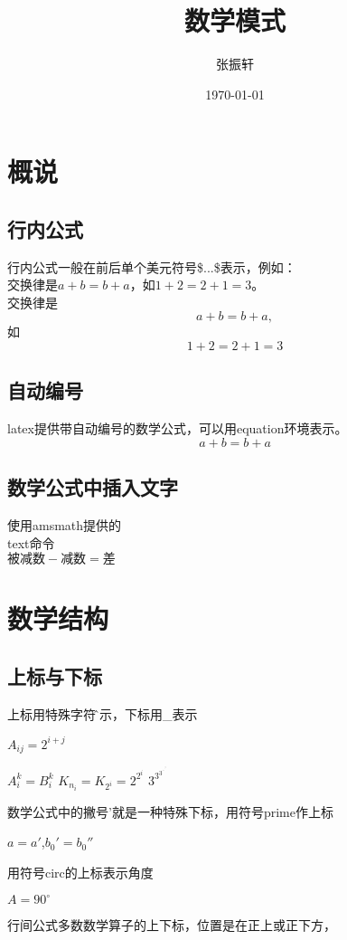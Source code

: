 \documentclass[12pt]{article}
\title{数学模式}
\author{张振轩}
\date{\today}
\begin{document}
	
\maketitle
\section{概说}
\subsection{行内公式}
行内公式一般在前后单个美元符号\$...\$表示，例如：\\
交换律是$a+b=b+a$，如$1+2=2+1=3$。\\
交换律是
\[a+b=b+a,\]
如
\[
1+2=2+1=3
\]

\subsection{自动编号}
latex提供带自动编号的数学公式，可以用equation环境表示。
\begin{equation}
	a+b=b+a \label{eq:commutative}
\end{equation}

\subsection{数学公式中插入文字}
使用amsmath提供的\\text命令 \\
$\text{被减数} - \text{减数} = \text{差}$
	
\section{数学结构}
\subsection{上标与下标}
上标用特殊字符\^表示，下标用\_表示

$A_{ij} = 2^{i+j}$

$A_i^k = B^k_i$ \qquad
$K_{n_i}  = K_{2^i} = 2^{2^i}$ \qquad
$3^{3^{3^{\cdot^{\cdot^{\cdot^3}}}}}$


数学公式中的撇号'就是一种特殊下标，用符号prime作上标

$a = a'$,$b_0' = b_0''$

用符号circ的上标表示角度

$A = 90^\circ$

行间公式多数数学算子的上下标，位置是在正上或正下方，
\end{document}
